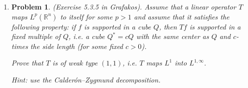 \documentclass[a4paper]{article}
\newtheorem*{problem}{Problem}
\begin{document}
\begin{enumerate}
\begin{proof}
    $T$ anticommutes with reflections, so
    \begin{align*}
      m \tilde{\widehat{f}} &= m \widehat{\tilde{f}} \\
      &= \widehat{T( \tilde{f} ) } \\
      &= - \widehat{ \tilde{T(f)} } \\
      &= - \tilde{ \widehat{T(f)} } \\
      &= - \tilde{m} \tilde{ \widehat{f} }
    \end{align*}

    Therefore, $m = - \tilde{m}$, that is, $m$ is an odd function.

    Let $f_a(x) = f(ax)$ for any $a>0$. $T$ commutes with dilations, so
    \begin{align*}
      \frac{1}{|a|} m \left( \widehat{f} \right)_{\frac{1}{a}} &= m (f_a)^{\widehat{}} \\
      &= \widehat{T(f_a)} \\
      &= \left( \widehat{Tf} \right)_a \\
      &= \frac{1}{|a|} \left( \widehat{Tf} \right)_{\frac{1}{a}} \\
      &= \frac{1}{|a|} ( m \widehat{f} )_{\frac{1}{a}} \\
      &= \frac{1}{|a|} m_{\frac{1}{a}} ( \widehat{f} )_{\frac{1}{a}}
    \end{align*}

    Therefore, $m(\xi) = m(\frac{1}{a} \xi)$ for all $\xi$. Combining this with the fact that $m$ is odd, we know $m(\xi) = c \textup{ sgn} (\xi)$ for
    some $c>0$, and $T$ is a multiple of the Hilbert transform.

  \end{proof}

\item
  \begin{problem}
    (Exercise 5.3.5 in Grafakos). Assume that a linear operator  $ T$ maps $L^p (\mathbb R^n)$ to itself for some $p >1$ and assume that it satisfies the following property: if $f$ is supported in a cube $Q$, then $Tf$ is supported in a fixed multiple of $Q$, i.e. a cube $Q^* = c Q$ with the same center as $Q$ and $c$-times the side length (for some fixed $c>0$).

    Prove that $T$ is of weak type $(1,1)$, i.e. $T$ maps $L^1$ into $L^{1,\infty}$.

    Hint: use the Calder\'{o}n--Zygmund decomposition.
  \end{problem}


\end{enumerate}
\end{document}
